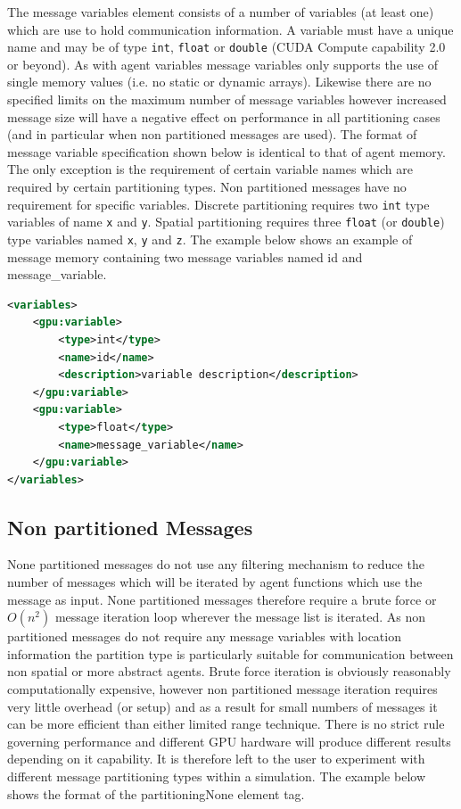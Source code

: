 \documentclass[11pt, a4paper, onecolumn, oneside]{report}
\begin{document}
The message variables element consists of a number of variables (at least one) which are use to hold communication information.
A variable must have a unique name and may be of type \texttt{int}, \texttt{float} or \texttt{double} (CUDA Compute capability 2.0 or beyond).
As with agent variables message variables only supports the use of single memory values (i.e. no static or dynamic arrays).
Likewise there are no specified limits on the maximum number of message variables however increased message size will have a negative effect on performance in all partitioning cases (and in particular when non partitioned messages are used).
The format of message variable specification shown below is identical to that of agent memory.
The only exception is the requirement of certain variable names which are required by certain partitioning types.
Non partitioned messages have no requirement for specific variables.
Discrete partitioning requires two \texttt{int} type variables of name \texttt{x} and \texttt{y}.
Spatial partitioning requires three \texttt{float} (or \texttt{double}) type variables named \texttt{x}, \texttt{y} and \texttt{z}.
The example below shows an example of message memory containing two message variables named id and message\_variable.


\begin{lstlisting}[language=XML]
<variables>
    <gpu:variable>
        <type>int</type>
        <name>id</name>
        <description>variable description</description>
    </gpu:variable>
    <gpu:variable>
        <type>float</type>
        <name>message_variable</name>
    </gpu:variable>
</variables>
\end{lstlisting}

\subsection{Non partitioned Messages}
\label{sec:242}

None partitioned messages do not use any filtering mechanism to reduce the number of messages which will be iterated by agent functions which use the message as input.
None partitioned messages therefore require a brute force or $O(n^{2})$ message iteration loop wherever the message list is iterated.
As non partitioned messages do not require any message variables with location information the partition type is particularly suitable for communication between non spatial or more abstract agents.
Brute force iteration is obviously reasonably computationally expensive, however non partitioned message iteration requires very little overhead (or setup) and as a result for small numbers of messages it can be more efficient than either limited range technique.
There is no strict rule governing performance and different GPU hardware will produce different results depending on it capability.
It is therefore left to the user to experiment with different message partitioning types within a simulation.
The example below shows the format of the partitioningNone element tag.
\end{document}
